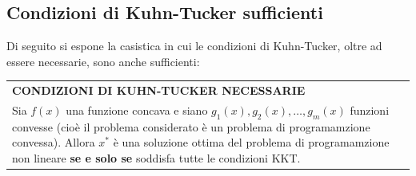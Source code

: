 \documentclass[a4paper]{extarticle}
\renewcommand\arraystretch{}
\begin{document}
\vspace{1em}
\subsection{Condizioni di Kuhn-Tucker sufficienti}
Di seguito si espone la casistica in cui le condizioni di Kuhn-Tucker, oltre ad essere necessarie, sono anche sufficienti:

\vspace{1em}
\setlength{\tabcolsep}{14pt}
\renewcommand{\arraystretch}{2}
\noindent
\begin{tabularx}{\textwidth}{@{}|P|@{}}
    \hline
    {\textbf{CONDIZIONI DI KUHN-TUCKER NECESSARIE}}\\
    \parbox{\linewidth}{Sia $f(x)$ una funzione concava e siano $g_1(x), g_2 (x), \dots , g_m (x)$ funzioni convesse (cioè il problema considerato è un problema di programamzione convessa). Allora $x^*$ è una soluzione ottima del problema di programamzione non lineare \textbf{se e solo se} soddisfa tutte le condizioni KKT. \vspace{3mm}}\\
    \hline
\end{tabularx}

\vspace{1em}
\end{document}
